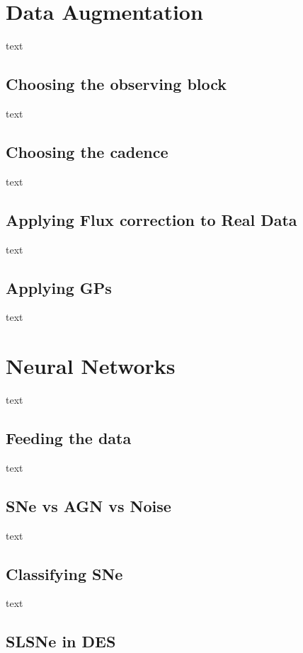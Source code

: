 \section{Data Augmentation}
text
\subsection{Choosing the observing block}
text
\subsection{Choosing the cadence}
text
\subsection{Applying Flux correction to Real Data}
text
\subsection{Applying GPs}
text

\section{Neural Networks}
text
\subsection{Feeding the data}
text
\subsection{SNe vs AGN vs Noise}
text
\subsection{Classifying SNe}
text
\subsection{SLSNe in DES}

